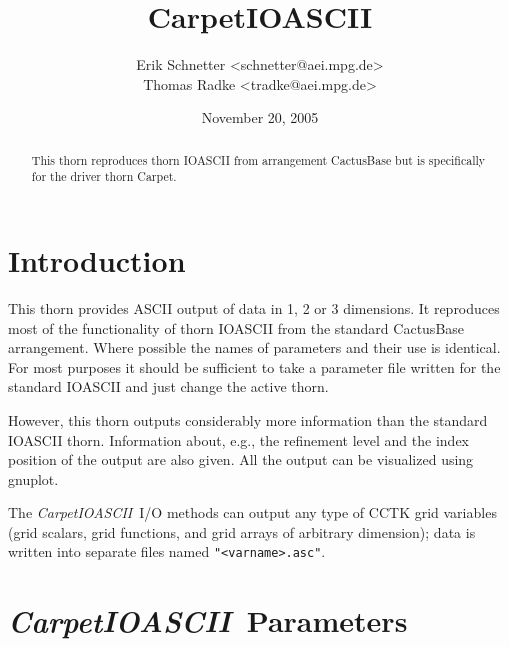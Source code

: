 \documentclass{article}
\begin{document}
\author{Erik Schnetter \textless schnetter@aei.mpg.de\textgreater\\
        Thomas Radke \textless tradke@aei.mpg.de\textgreater}

\title{CarpetIOASCII}

\date{November 20, 2005}

\maketitle


\newcommand{\ThisThorn}{{\it CarpetIOASCII}}

\begin{abstract}
  This thorn reproduces thorn IOASCII from arrangement CactusBase but
  is specifically for the driver thorn Carpet.
\end{abstract}


\section{Introduction}

This thorn provides ASCII output of data in 1, 2 or 3 dimensions. It
reproduces most of the functionality of thorn IOASCII from the
standard CactusBase arrangement. Where possible the names of
parameters and their use is identical. For most purposes it should be
sufficient to take a parameter file written for the standard IOASCII
and just change the active thorn.

However, this thorn outputs considerably more information than the
standard IOASCII thorn. Information about, e.g., the refinement level
and the index position of the output are also given. All the output
can be visualized using gnuplot.

The \ThisThorn\ I/O methods can output any type of CCTK grid variables
(grid scalars, grid functions, and grid arrays of arbitrary dimension);
data is written into separate files named {\tt "<varname>.asc"}.


\section{\ThisThorn\ Parameters}
\end{document}
